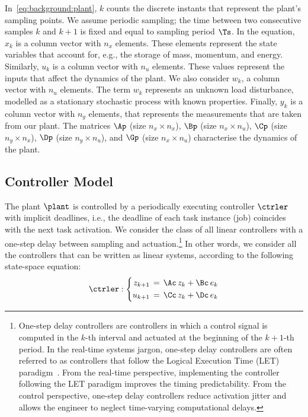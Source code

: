 In~\eqref{eq:background:plant}, $k$ counts the discrete instants that represent the plant's sampling points.
We assume periodic sampling; the time between two consecutive samples $k$ and $k+1$ is fixed and equal to sampling period $\Ts$.
In the equation, $x_k$ is a column vector with $n_x$ elements.
These elements represent the state variables that account for, e.g., the storage of mass, momentum, and energy.
Similarly, $u_k$ is a column vector with $n_u$ elements.
These values represent the inputs that affect the dynamics of the plant.
We also consider $w_k$, a column vector with $n_u$ elements.
The term $w_k$ represents an unknown load disturbance, modelled as a stationary stochastic process with known properties.
Finally, $y_k$ is a column vector with $n_y$ elements, that represents the measurements that are taken from our plant.
The matrices $\Ap$ (size $n_x \times n_x$), $\Bp$ (size $n_x \times n_u$), $\Cp$ (size $n_y \times n_x$), $\Dp$ (size $n_y \times n_u$), and $\Gp$ (size $n_x \times n_u$) characterise the dynamics of the plant.

\subsection{Controller Model}

The plant $\plant$ is controlled by a periodically executing controller $\ctrler$ with implicit deadlines, i.e., the deadline of each task instance (job) coincides with the next task activation.
We consider the class of all linear controllers with a one-step delay between sampling and actuation.\footnote{One-step delay controllers are controllers in which a control signal is computed in the $k$-th interval and actuated at the beginning of the $k+1$-th period. In the real-time systems jargon, one-step delay controllers are often referred to as controllers that follow the Logical Execution Time (LET) paradigm~\cite{Kirsch:2012, Ernst:2018}. From the real-time perspective, implementing the controller following the LET paradigm improves the timing predictability. From the control perspective, one-step delay controllers reduce activation jitter and allows the engineer to neglect time-varying computational delays.}
In other words, we consider all the controllers that can be written as linear systems, according to the following state-space equation:
\begin{equation}
\label{eq:background:controller}
    \ctrler : \left\{
    \begin{aligned}
        z_{k+1} &\,=\, \Ac\,z_k + \Bc\,e_k \\
        u_{k+1} &\,=\, \Cc\,z_k + \Dc\,e_k
    \end{aligned}
    \right.
\end{equation}

